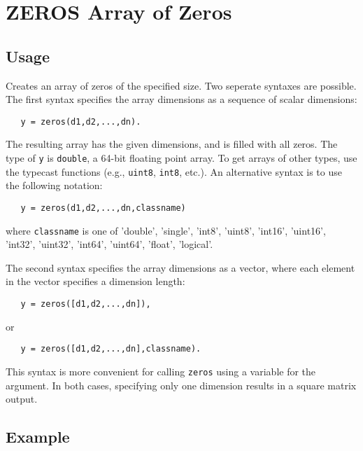 \section{ZEROS Array of Zeros}

\subsection{Usage}

Creates an array of zeros of the specified size.  Two seperate 
syntaxes are possible.  The first syntax specifies the array 
dimensions as a sequence of scalar dimensions:
\begin{verbatim}
   y = zeros(d1,d2,...,dn).
\end{verbatim}
The resulting array has the given dimensions, and is filled with
all zeros.  The type of \verb|y| is \verb|double|, a 64-bit floating
point array.  To get arrays of other types, use the typecast 
functions (e.g., \verb|uint8|, \verb|int8|, etc.).  An alternative syntax
is to use the following notation:
\begin{verbatim}
   y = zeros(d1,d2,...,dn,classname)
\end{verbatim}
where \verb|classname| is one of 'double', 'single', 'int8', 'uint8',
'int16', 'uint16', 'int32', 'uint32', 'int64', 'uint64', 'float', 'logical'.  
    
The second syntax specifies the array dimensions as a vector,
where each element in the vector specifies a dimension length:
\begin{verbatim}
   y = zeros([d1,d2,...,dn]),
\end{verbatim}
or
\begin{verbatim}
   y = zeros([d1,d2,...,dn],classname).
\end{verbatim}
This syntax is more convenient for calling \verb|zeros| using a 
variable for the argument.  In both cases, specifying only one
dimension results in a square matrix output.
\subsection{Example}


